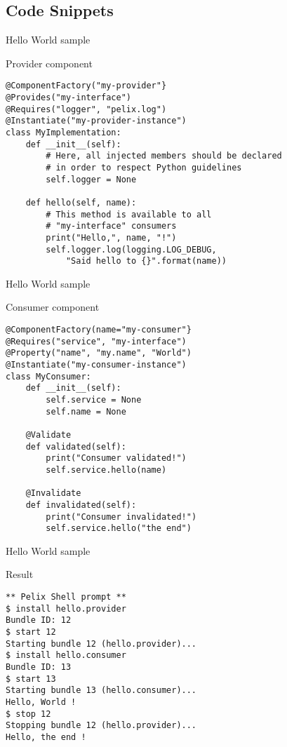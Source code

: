 \subsection{Code Snippets}

\begin{frame}[fragile]{Hello World sample}
\begin{block}{Provider component}
\begin{verbatim}
@ComponentFactory("my-provider"}
@Provides("my-interface")
@Requires("logger", "pelix.log")
@Instantiate("my-provider-instance")
class MyImplementation:
    def __init__(self):
    	# Here, all injected members should be declared
    	# in order to respect Python guidelines
        self.logger = None

    def hello(self, name):
        # This method is available to all
        # "my-interface" consumers
        print("Hello,", name, "!")
        self.logger.log(logging.LOG_DEBUG,
            "Said hello to {}".format(name))
\end{verbatim}
\end{block}
\end{frame}

\begin{frame}[fragile]{Hello World sample}
\begin{block}{Consumer component}
\begin{verbatim}
@ComponentFactory(name="my-consumer"}
@Requires("service", "my-interface")
@Property("name", "my.name", "World")
@Instantiate("my-consumer-instance")
class MyConsumer:
    def __init__(self):
        self.service = None
        self.name = None

    @Validate
    def validated(self):
        print("Consumer validated!")
        self.service.hello(name)
	
    @Invalidate
    def invalidated(self):
        print("Consumer invalidated!")
        self.service.hello("the end")
\end{verbatim}
\end{block}
\end{frame}


\begin{frame}[fragile]{Hello World sample}
\begin{block}{Result}
\begin{verbatim}
** Pelix Shell prompt **
$ install hello.provider
Bundle ID: 12
$ start 12
Starting bundle 12 (hello.provider)...
$ install hello.consumer
Bundle ID: 13
$ start 13
Starting bundle 13 (hello.consumer)...
Hello, World !
$ stop 12
Stopping bundle 12 (hello.provider)...
Hello, the end !
\end{verbatim}
\end{block}
\end{frame}
